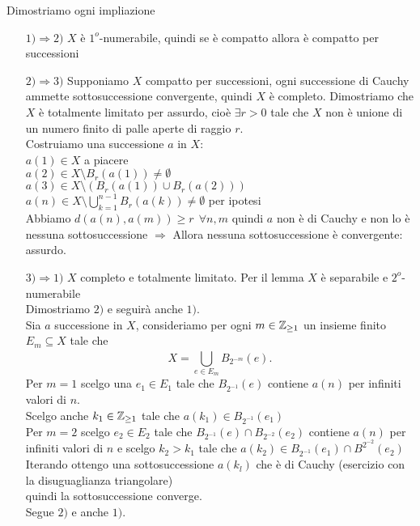 \documentclass[12px]{article}
\begin{document}
	\begin{dimo}
		Dimostriamo ogni impliazione
		\begin{enumerate}
			\item[ $1)\Rightarrow 2)$] $X $ è $1^o $-numerabile, quindi se è compatto allora è compatto per successioni
			\item [$2) \Rightarrow  3)$] Supponiamo $X$ compatto per successioni, ogni successione di Cauchy ammette sottosuccessione convergente, quindi  $X$ è completo. Dimostriamo che $X $ è totalmente limitato per assurdo, cioè $\exists r > 0 $ tale che  $X $ non è unione di un numero finito di palle aperte di raggio $r$.\\
				Costruiamo una successione  $a$ in $X$:\\
				$a(1)\in X$ a piacere\\
				 $a(2)\in X\setminus B_r(a(1))\neq \emptyset$\\
				  $a(3)\in  X\setminus (B_r(a(1))\cup B_r(a(2)))$\\
				  $a(n)\in X\setminus \bigcup^{n-1}_{k=1}B_r(a(k))\neq \emptyset$ per ipotesi\\
				  Abbiamo $d(a(n),a(m))\geq r \ \ \forall n,m$ quindi  $a $ non è di Cauchy e non lo è nessuna sottosuccessione $ \Rightarrow $ Allora nessuna sottosuccessione è convergente: assurdo.
			  \item[ $3) \Rightarrow  1)$ ] $X$ completo e totalmente limitato. Per il lemma $X$ è separabile e $2^o$-numerabile\\
				  Dimostriamo $2)$ e seguirà anche $1)$.\\
				  Sia  $a$ successione in $X$, consideriamo per ogni $m\in\mathbb{Z}_{\geq 1}$ un insieme finito  $E_m\subseteq X$ tale che 
				  \[
					  X = \bigcup^{}_{e\in E_m}B_{2^{-m}}(e)
				  .\] 
				  Per $m = 1$ scelgo una  $e_1\in E_1$ tale che $B_{2^{-1}}(e)$ contiene  $a(n)$ per infiniti valori di  $n$.\\
				  Scelgo anche  $k_1\in\mathbb{Z}_{\geq 1}$ tale che $a(k_1)\in B_{2^{-1}}(e_1)$\\
				  Per $m = 2$ scelgo  $e_2\in E_2$ tale che $B_{2^{-1}}(e)\cap B_{2^{-2}}(e_2)$ contiene $a(n)$ per infiniti valori di $n$ e scelgo  $k_2 > k_1$ tale che $a(k_2)\in B_{2^{-1}}(e_1)\cap B^{2^{-2}}(e_2)$\\
				  Iterando ottengo una sottosuccessione $a(k_l)$ che è di Cauchy (esercizio con la disuguaglianza  triangolare)\\
				  quindi la sottosuccessione converge.\\
				  Segue $2)$ e anche $1)$.
		\end{enumerate}
	\end{dimo}
\end{document}

